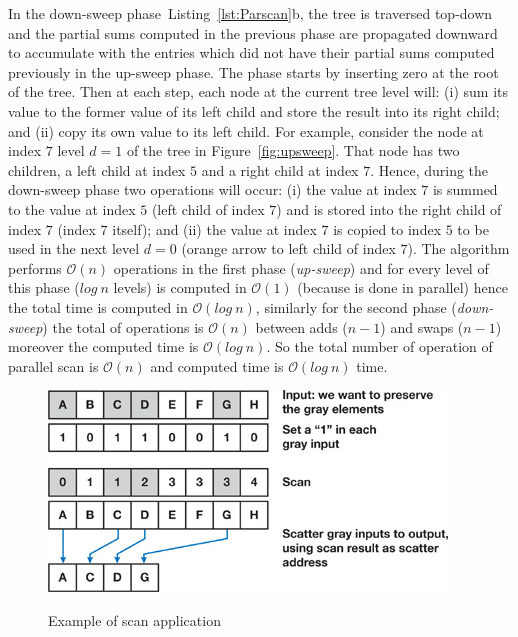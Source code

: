 \documentclass[Ingles]{ic-tese-v1}
\newcommand{\rfig}[1]{Figure~\ref{fig:#1}}
\newcommand{\rlsts}[2]{Listing~\ref{lst:#1}{#2}}
\begin{document}
In  the down-sweep  phase~\rlsts{Parscan}{b},  the  tree is  traversed
top-down and  the partial sums computed in the previous phase are propagated
downward to accumulate  with the  entries which  did not  have their  partial
sums computed  previously  in the  up-sweep  phase.   The phase  starts  by
inserting zero at the  root of the tree. Then at  each step, each node at the
current tree level will: (i)  sum its value to the former value of its left
child and store the  result into its right child; and (ii) copy its own value
to its  left child.  For example, consider the node at index $7$  level $d = 1$
of the tree in  \rfig{upsweep}. That node has two children, a left child at
index $5$ and a right child at index $7$.  Hence,  during the down-sweep  phase
two operations  will occur: (i) the value at  index $7$ is summed to the value
at index $5$ (left child of index  $7$) and is stored  into the right child  of
index $7$ (index $7$ itself); and (ii) the value at index $7$ is copied to
index $5$ to be used  in the next level $d = 0$ (orange  arrow to left child of
index $7$). The algorithm  performs $\mathcal{O}(n)$ operations in the first
phase (\textit{up-sweep}) and for every level of this phase ($log\ n $ levels)
is computed in $\mathcal{O}(1)$ (because is done in parallel) hence the total
time is computed in $\mathcal{O}(log\ n)$, similarly for the second phase
(\textit{down-sweep}) the total of operations is $\mathcal{O}(n)$ between adds
($n-1$) and swaps ($n-1$) moreover the computed time is $\mathcal{O}(log\ n)$.
So the total number of operation of parallel scan is $\mathcal{O}(n)$ and
computed time is $\mathcal{O}(log\ n)$ time.

\begin{figure}[t]
	\centering
	\caption{Example of scan application}
	\includegraphics[scale=1.0]{images/desireElements.jpg}
	\label{fig:desire}
\end{figure}
\end{document}
